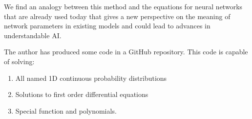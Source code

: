 \documentclass{article}
\begin{document}
We find an analogy between this method and the equations for neural networks that are already used today that gives a new perspective on the meaning of network parameters in existing models and could lead to advances in understandable AI. 

The author has produced some code in a GitHub repository. This code is capable of solving:

\begin{enumerate}
\item All named 1D continuous probability distributions
\item Solutions to first order differential equations 
\item Special function and polynomials.
\end{enumerate}
\end{document}
